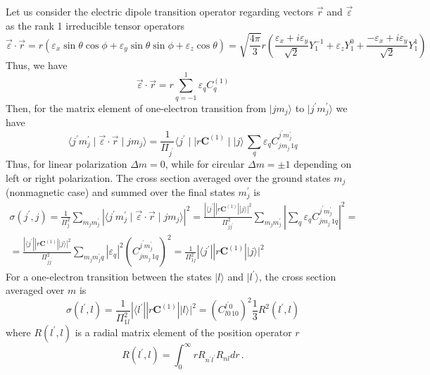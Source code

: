 \documentclass[a4paper,oneside,12pt]{extarticle}
\begin{document}
Let us consider the electric dipole transition operator regarding vectors $\vec{r}$ and $\vec{\varepsilon}$ as the rank 1 irreducible tensor operators
\begin{equation}
\vec{\varepsilon} \cdot \vec{r} = 
r(\varepsilon_x \sin\theta\cos\phi + \varepsilon_y \sin\theta\sin\phi + \varepsilon_z \cos\theta) = 
\sqrt{\frac{4\pi}{3}} r \left(
\frac{\varepsilon_x + i\varepsilon_y}{\sqrt{2}} Y_1^{-1} +
\varepsilon_z Y_1^{0} +
\frac{-\varepsilon_x + i\varepsilon_y}{\sqrt{2}} Y_1^{1}
\right)
\label{eq:expansion}
\end{equation}
%
Thus, we have
%
$$
\vec{\varepsilon} \cdot \vec{r} = 
r \sum_{q=-1}^1 \varepsilon_q C_{q}^{(1)}
$$
%
Then, for the matrix element of one-electron transition from $|j m_j\rangle$ to $|j^{\prime} m_j^{\prime}\rangle$ we have
%
$$
\langle j^{\prime} m_j^{\prime} \mid \vec{\varepsilon} \cdot \vec{r} \mid j m_j \rangle = 
\frac{1}{\Pi_{j^{\prime}}}
\langle j^{\prime} \mid\mid r\mathbf{C}^{(1)} \mid\mid j \rangle  \,
\sum_q  \varepsilon_q C_{j m_j \, 1 q}^{j^{\prime} m_j^{\prime}}
$$
Thus, for linear polarization $\Delta m=0$, while for circular $\Delta m=\pm 1$ depending on left or right polarization.
The cross section averaged over the ground states $m_j$ (nonmagnetic case) and summed over the final states $m_j^{\prime}$ is
\begin{multline}
\sigma(j^{\prime},j) = \frac{1}{\Pi_j^2} \sum_{m_j m_j^{\prime}}
|\langle j^{\prime} m_j^{\prime} \mid \vec{\varepsilon} \cdot \vec{r} \mid j m_j \rangle |^2 = 
\frac{|\langle j^{\prime} || r\mathbf{C}^{(1)} || j \rangle|^2}{\Pi_{jj^{\prime}}^2}  
\sum_{m_j m_j^{\prime}} \left| \sum_{q} \varepsilon_q
C_{j m_j \, 1 q}^{j^{\prime} m_j^{\prime}}\right|^2 = \\
= \frac{|\langle j^{\prime} || r\mathbf{C}^{(1)} || j \rangle|^2}{\Pi_{jj^{\prime}}^2}  
\sum_{m_j m_j^{\prime}q} |\varepsilon_q|^2
\left(C_{j m_j \, 1 q}^{j^{\prime} m_j^{\prime}}\right)^2
= \frac{1}{\Pi_{1 j}^2} |\langle j^{\prime} || r\mathbf{C}^{(1)} || j \rangle|^2
\end{multline}
%
For a one-electron transition between the states $|l\rangle$ and $|l^{\prime}\rangle$, the cross section averaged over $m$ is
\begin{equation}
\sigma(l^{\prime},l) = 
\frac{1}{\Pi_{1 l}^2} |\langle l^{\prime} || r\mathbf{C}^{(1)} || l \rangle|^2 =
\left(C_{l 0 \, 1 0}^{l^{\prime} 0} \right)^2 \frac{1}{3} R^2(l^{\prime},l)
\label{eq:sigma_1}
\end{equation}
%
where $R(l^{\prime},l)$ is a radial matrix element of the position operator $r$
$$
R(l^{\prime},l) = \int_0^{\infty} r R_{n^{\prime}l^{\prime}} R_{nl} dr \,.
$$
\end{document}
